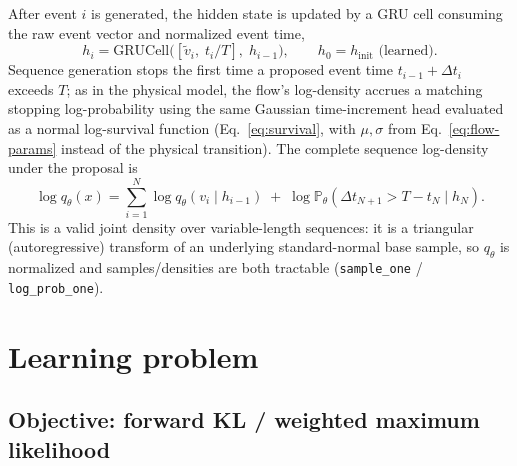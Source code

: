 \documentclass[11pt]{article}
\newcommand{\Prob}{\mathbb{P}}
\newcommand{\dt}{\Delta t}
\begin{document}
After event $i$ is generated, the hidden state is updated by a GRU cell
consuming the raw event vector and normalized event time,
\begin{equation}
h_i = \mathrm{GRUCell}\big([\tilde v_i,\; t_i/T],\; h_{i-1}\big),
\qquad h_0 = h_{\mathrm{init}} \text{ (learned)}.
\end{equation}
Sequence generation stops the first time a proposed event time
$t_{i-1} + \dt_i$ exceeds $T$; as in the physical model, the flow's
log-density accrues a matching stopping log-probability using the same
Gaussian time-increment head evaluated as a normal log-survival function
(Eq.~\eqref{eq:survival}, with $\mu,\sigma$ from Eq.~\eqref{eq:flow-params}
instead of the physical transition). The complete sequence log-density under
the proposal is
\begin{equation}
\log q_\theta(x)
=
\sum_{i=1}^N \log q_\theta(v_i \mid h_{i-1})
\;+\;
\log \Prob_\theta(\dt_{N+1} > T - t_N \mid h_N).
\label{eq:flow-density}
\end{equation}
This is a valid joint density over variable-length sequences: it is a
triangular (autoregressive) transform of an underlying standard-normal base
sample, so $q_\theta$ is normalized and samples/densities are both tractable
(\texttt{sample\_one} / \texttt{log\_prob\_one}).

\section{Learning problem}

\subsection{Objective: forward KL / weighted maximum likelihood}
\end{document}
